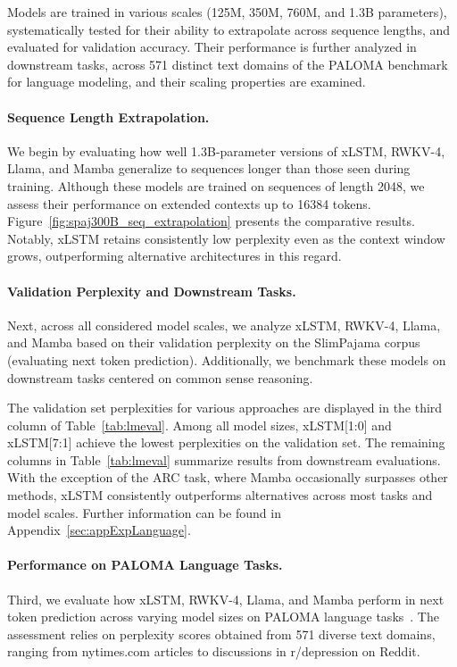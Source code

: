 Models are trained in various scales (125M, 350M, 760M, and 1.3B parameters), systematically tested for their ability to extrapolate across sequence lengths, and evaluated for validation accuracy. Their performance is further analyzed in downstream tasks, across 571 distinct text domains of the PALOMA benchmark for language modeling, and their scaling properties are examined.

\paragraph{Sequence Length Extrapolation.}
\label{sec:spaj300B_ctx_extrapolation}
We begin by evaluating how well 1.3B-parameter versions of xLSTM, RWKV-4, Llama, and Mamba generalize to sequences longer than those seen during training. Although these models are trained on sequences of length 2048, we assess their performance on extended contexts up to 16384 tokens. Figure~\ref{fig:spaj300B_seq_extrapolation} presents the comparative results. Notably, xLSTM retains consistently low perplexity even as the context window grows, outperforming alternative architectures in this regard.

\paragraph{Validation Perplexity and Downstream Tasks.}
\label{sec:spaj_downstream_eval}
Next, across all considered model scales, we analyze xLSTM, RWKV-4, Llama, and Mamba based on their validation perplexity on the SlimPajama corpus (evaluating next token prediction). Additionally, we benchmark these models on downstream tasks centered on common sense reasoning.

The validation set perplexities for various approaches are displayed in the third column of Table~\ref{tab:lmeval}. Among all model sizes, xLSTM[1:0] and xLSTM[7:1] achieve the lowest perplexities on the validation set. The remaining columns in Table~\ref{tab:lmeval} summarize results from downstream evaluations. With the exception of the ARC task, where Mamba occasionally surpasses other methods, xLSTM consistently outperforms alternatives across most tasks and model scales. Further information can be found in Appendix~\ref{sec:appExpLanguage}.

\paragraph{Performance on PALOMA Language Tasks.} Third, we evaluate how xLSTM, RWKV-4, Llama, and Mamba perform in next token prediction across varying model sizes on PALOMA language tasks~\citep{Magnusson:23arxivshort}. The assessment relies on perplexity scores obtained from 571 diverse text domains, ranging from nytimes.com articles to discussions in r/depression on Reddit. 

